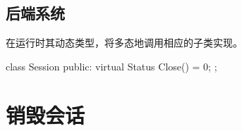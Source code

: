 \begin{content}
\subsection{后端系统}

在运行时其动态类型，将多态地调用相应的子类实现。

\begin{leftbar}
\begin{c++}[caption={tensorflow/core/common\_runtime/session.h}]
class Session {
public:
  virtual Status Close() = 0;
};
\end{c++}
\end{leftbar}

\end{content}

\section{销毁会话}

